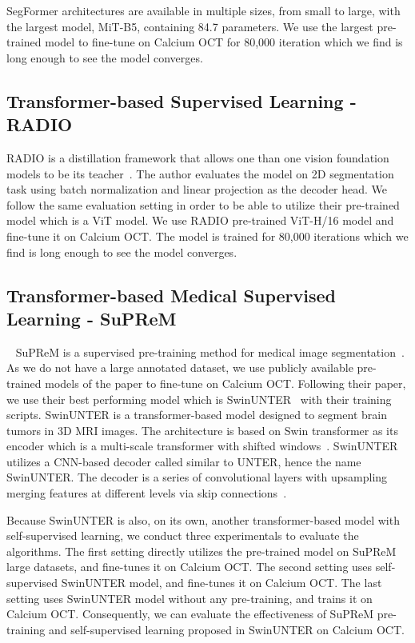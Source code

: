 \documentclass[a4paper,11pt,oneside]{report}
\begin{document}
SegFormer architectures are available in multiple sizes, from small to large, with the largest model, MiT-B5, containing 84.7 parameters. We use the largest pre-trained model to fine-tune on Calcium OCT for 80,000 iteration which we find is long enough to see the model converges.

\subsection{Transformer-based Supervised Learning - RADIO}
RADIO is a distillation framework that allows one than one vision foundation models to be its teacher~\cite{Ranzinger2024RADIO}. The author evaluates the model on 2D segmentation task using batch normalization and linear projection as the decoder head. We follow the same evaluation setting in order to be able to utilize their pre-trained model which is a ViT model. We use RADIO pre-trained ViT-H/16 model and fine-tune it on Calcium OCT. The model is trained for 80,000 iterations which we find is long enough to see the model converges.

\subsection{Transformer-based Medical Supervised Learning - SuPReM}~\label{sec:design:suprem}
SuPReM is a supervised pre-training method for medical image segmentation~\cite{Li2024}. As we do not have a large annotated dataset, we use publicly available pre-trained models of the paper to fine-tune on Calcium OCT. Following their paper, we use their best performing model which is SwinUNTER~\cite{Tang2022} with their training scripts. SwinUNTER is a transformer-based model designed to segment brain tumors in 3D MRI images. The architecture is based on Swin transformer as its encoder which is a multi-scale transformer with shifted windows~\cite{Liu2021Swin}. SwinUNTER utilizes a CNN-based decoder called similar to UNTER, hence the name SwinUNTER. The decoder is a series of convolutional layers with upsampling merging features at different levels via skip connections~\cite{Hatamizadeh2022}.

Because SwinUNTER is also, on its own, another transformer-based model with self-supervised learning, we conduct three experimentals to evaluate the algorithms. The first setting directly utilizes the pre-trained model on SuPReM large datasets, and fine-tunes it on Calcium OCT. The second setting uses self-supervised SwinUNTER model, and fine-tunes it on Calcium OCT. The last setting uses SwinUNTER model without any pre-training, and trains it on Calcium OCT. Consequently, we can evaluate the effectiveness of SuPReM pre-training and self-supervised learning proposed in SwinUNTER on Calcium OCT.
\end{document}
